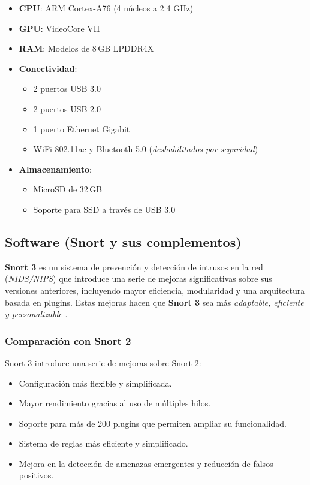 \documentclass[12pt,a4paper]{report}
\begin{document}
\begin{itemize}
	\item \textbf{CPU}: ARM Cortex-A76 (4 núcleos a 2.4 GHz)
	\item \textbf{GPU}: VideoCore VII
	\item \textbf{RAM}: Modelos de 8\,GB LPDDR4X
	\item \textbf{Conectividad}:
	\begin{itemize}
		\item 2 puertos USB 3.0
		\item 2 puertos USB 2.0
		\item 1 puerto Ethernet Gigabit
		\item WiFi 802.11ac y Bluetooth 5.0 (\textit{deshabilitados por seguridad})
	\end{itemize}
	\item \textbf{Almacenamiento}:
	\begin{itemize}
		\item MicroSD de 32\,GB
		\item Soporte para SSD a través de USB 3.0
	\end{itemize}
\end{itemize}

\subsection{Software (Snort y sus complementos)}
\textbf{Snort 3} es un sistema de prevención y detección de intrusos en la red (\textit{NIDS/NIPS}) que introduce una serie de mejoras significativas sobre sus versiones anteriores, incluyendo mayor eficiencia, modularidad y una arquitectura basada en plugins. Estas mejoras hacen que \textbf{Snort 3} sea más \textit{adaptable, eficiente y personalizable} \cite{snort3_vs_snort2}.

\subsubsection{Comparación con Snort 2}
Snort 3 introduce una serie de mejoras sobre Snort 2:
\begin{itemize}
	\item Configuración más flexible y simplificada.
	\item Mayor rendimiento gracias al uso de múltiples hilos.
	\item Soporte para más de 200 plugins que permiten ampliar su funcionalidad.
	\item Sistema de reglas más eficiente y simplificado.
	\item Mejora en la detección de amenazas emergentes y reducción de falsos positivos.
\end{itemize}
\end{document}
